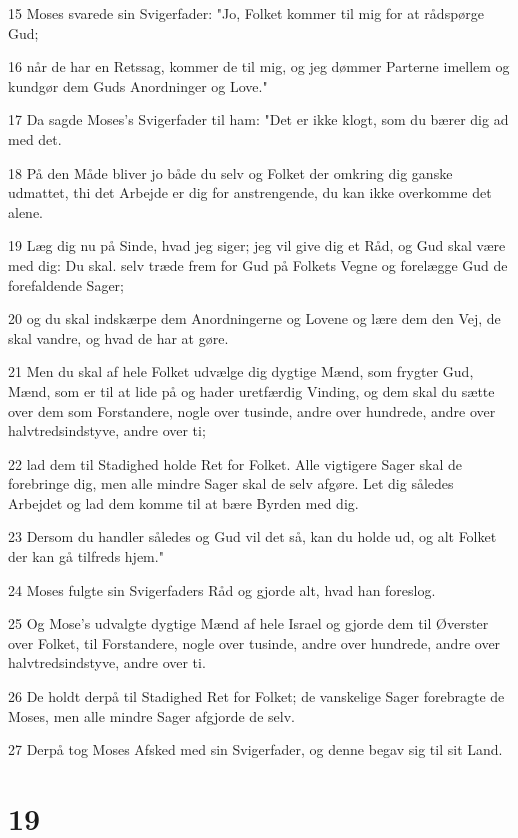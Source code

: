 \par 15 Moses svarede sin Svigerfader: "Jo, Folket kommer til mig for at rådspørge Gud;
\par 16 når de har en Retssag, kommer de til mig, og jeg dømmer Parterne imellem og kundgør dem Guds Anordninger og Love."
\par 17 Da sagde Moses's Svigerfader til ham: "Det er ikke klogt, som du bærer dig ad med det.
\par 18 På den Måde bliver jo både du selv og Folket der omkring dig ganske udmattet, thi det Arbejde er dig for anstrengende, du kan ikke overkomme det alene.
\par 19 Læg dig nu på Sinde, hvad jeg siger; jeg vil give dig et Råd, og Gud skal være med dig: Du skal. selv træde frem for Gud på Folkets Vegne og forelægge Gud de forefaldende Sager;
\par 20 og du skal indskærpe dem Anordningerne og Lovene og lære dem den Vej, de skal vandre, og hvad de har at gøre.
\par 21 Men du skal af hele Folket udvælge dig dygtige Mænd, som frygter Gud, Mænd, som er til at lide på og hader uretfærdig Vinding, og dem skal du sætte over dem som Forstandere, nogle over tusinde, andre over hundrede, andre over halvtredsindstyve, andre over ti;
\par 22 lad dem til Stadighed holde Ret for Folket. Alle vigtigere Sager skal de forebringe dig, men alle mindre Sager skal de selv afgøre. Let dig således Arbejdet og lad dem komme til at bære Byrden med dig.
\par 23 Dersom du handler således og Gud vil det så, kan du holde ud, og alt Folket der kan gå tilfreds hjem."
\par 24 Moses fulgte sin Svigerfaders Råd og gjorde alt, hvad han foreslog.
\par 25 Og Mose's udvalgte dygtige Mænd af hele Israel og gjorde dem til Øverster over Folket, til Forstandere, nogle over tusinde, andre over hundrede, andre over halvtredsindstyve, andre over ti.
\par 26 De holdt derpå til Stadighed Ret for Folket; de vanskelige Sager forebragte de Moses, men alle mindre Sager afgjorde de selv.
\par 27 Derpå tog Moses Afsked med sin Svigerfader, og denne begav sig til sit Land.

\chapter{19}

